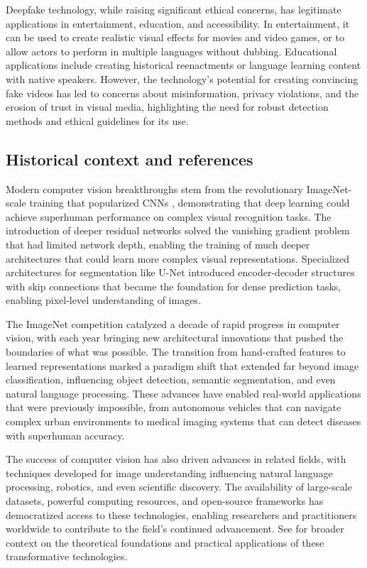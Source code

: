 Deepfake technology, while raising significant ethical concerns, has legitimate applications in entertainment, education, and accessibility. In entertainment, it can be used to create realistic visual effects for movies and video games, or to allow actors to perform in multiple languages without dubbing. Educational applications include creating historical reenactments or language learning content with native speakers. However, the technology's potential for creating convincing fake videos has led to concerns about misinformation, privacy violations, and the erosion of trust in visual media, highlighting the need for robust detection methods and ethical guidelines for its use.

\subsection{Historical context and references}

Modern computer vision breakthroughs stem from the revolutionary ImageNet-scale training that popularized CNNs \textcite{Krizhevsky2012}, demonstrating that deep learning could achieve superhuman performance on complex visual recognition tasks. The introduction of deeper residual networks \textcite{He2016} solved the vanishing gradient problem that had limited network depth, enabling the training of much deeper architectures that could learn more complex visual representations. Specialized architectures for segmentation like U-Net \textcite{Ronneberger2015} introduced encoder-decoder structures with skip connections that became the foundation for dense prediction tasks, enabling pixel-level understanding of images.

The ImageNet competition catalyzed a decade of rapid progress in computer vision, with each year bringing new architectural innovations that pushed the boundaries of what was possible. The transition from hand-crafted features to learned representations marked a paradigm shift that extended far beyond image classification, influencing object detection, semantic segmentation, and even natural language processing. These advances have enabled real-world applications that were previously impossible, from autonomous vehicles that can navigate complex urban environments to medical imaging systems that can detect diseases with superhuman accuracy.

The success of computer vision has also driven advances in related fields, with techniques developed for image understanding influencing natural language processing, robotics, and even scientific discovery. The availability of large-scale datasets, powerful computing resources, and open-source frameworks has democratized access to these technologies, enabling researchers and practitioners worldwide to contribute to the field's continued advancement. See \textcite{GoodfellowEtAl2016,Prince2023} for broader context on the theoretical foundations and practical applications of these transformative technologies.

